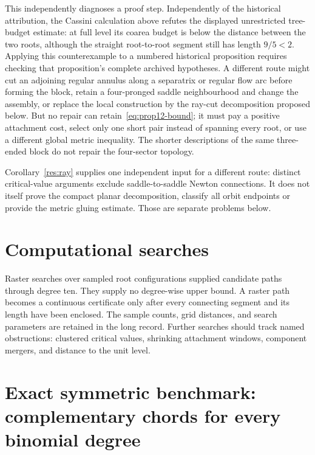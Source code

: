 \documentclass[11pt]{article}
\begin{document}
This independently diagnoses a proof step.  Independently of the historical
attribution, the Cassini calculation above refutes the displayed unrestricted
tree-budget estimate: at full level its coarea budget is below the distance
between the two roots, although the straight root-to-root segment still has
length $9/5<2$.  Applying this counterexample to a numbered historical
proposition requires checking that proposition's complete archived hypotheses.
A different route might
cut an adjoining regular annulus along a separatrix or regular flow arc before
forming the block, retain a four-pronged saddle neighbourhood and change the
assembly, or replace the local construction by the ray-cut decomposition
proposed below.  But no repair can retain~\eqref{eq:prop12-bound}; it must pay a
positive attachment cost, select only one short pair instead of spanning every
root, or use a different global metric inequality.
The shorter descriptions of the same three-ended block do not repair the
four-sector topology.

Corollary~\ref{res:ray} supplies one independent input for a different route:
distinct critical-value arguments exclude saddle-to-saddle Newton
connections.  It does not itself prove the compact planar decomposition,
classify all orbit endpoints or provide the metric gluing estimate.  Those are
separate problems below.

\section{Computational searches}\label{sec:finite}

Raster searches over sampled root configurations supplied candidate paths
through degree ten.  They supply no degree-wise upper bound.  A raster path
becomes a continuous certificate only after every connecting segment and its
length have been enclosed.  The sample counts, grid distances, and search
parameters are retained in the long record.  Further searches should track
named obstructions: clustered critical values, shrinking attachment windows,
component mergers, and distance to the unit level.

\section{Exact symmetric benchmark: complementary chords for every binomial degree}
\label{sec:binomial}

\end{document}

